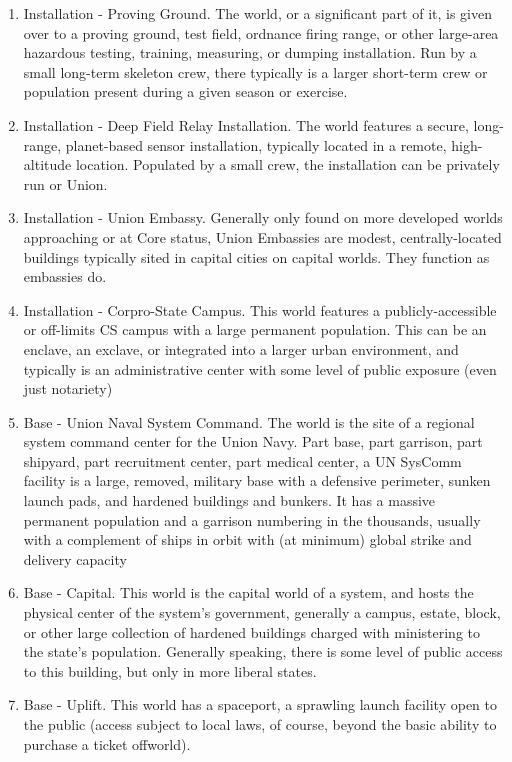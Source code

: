 \begin{enumerate}
    \item Installation - Proving Ground. The world, or a significant part of it, is given over to a proving ground, test field, ordnance firing range, or other large-area hazardous testing, training, measuring, or dumping installation. Run by a small long-term skeleton crew, there typically is a larger short-term crew or population present during a given season or exercise.
    \item Installation - Deep Field Relay Installation. The world features a secure, long-range, planet-based sensor installation, typically located in a remote, high-altitude location. Populated by a small crew, the installation can be privately run or Union.
    \item Installation - Union Embassy. Generally only found on more developed worlds approaching or at Core status, Union Embassies are modest, centrally-located buildings typically sited in capital cities on capital worlds. They function as embassies do.
    \item Installation - Corpro-State Campus. This world features a publicly-accessible or off-limits CS campus with a large permanent population. This can be an enclave, an exclave, or integrated into a larger urban environment, and typically is an administrative center with some level of public exposure (even just notariety)
    \item Base - Union Naval System Command. The world is the site of a regional system command center for the Union Navy. Part base, part garrison, part shipyard, part recruitment center, part medical center, a UN SysComm facility is a large, removed, military base with a defensive perimeter, sunken launch pads, and hardened buildings and bunkers. It has a massive permanent population and a garrison numbering in the thousands, usually with a complement of ships in orbit with (at minimum) global strike and delivery capacity
    \item Base - Capital. This world is the capital world of a system, and hosts the physical center of the system’s government, generally a campus, estate, block, or other large collection of hardened buildings charged with ministering to the state’s population. Generally speaking, there is some level of public access to this building, but only in more liberal states.
    \item Base - Uplift. This world has a spaceport, a sprawling launch facility open to the public (access subject to local laws, of course, beyond the basic ability to purchase a ticket offworld).

\end{enumerate}

